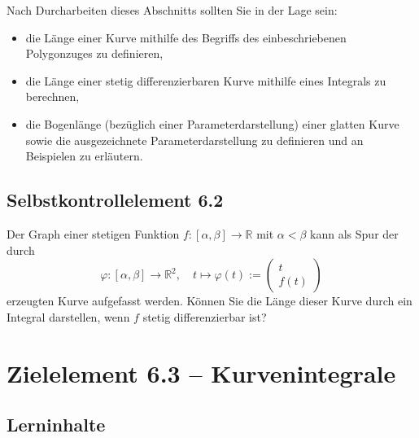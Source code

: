 \documentclass[a4paper,12pt]{article}
\begin{document}
Nach Durcharbeiten dieses Abschnitts sollten Sie in der Lage sein:
\begin{itemize}
  \item die Länge einer Kurve mithilfe des Begriffs des einbeschriebenen
        Polygonzuges zu definieren,
  \item die Länge einer stetig differenzierbaren Kurve mithilfe eines
        Integrals zu berechnen,
  \item die Bogenlänge (bezüglich einer Parameterdarstellung) einer glatten
        Kurve sowie die ausgezeichnete Parameterdarstellung zu definieren und
        an Beispielen zu erläutern.
\end{itemize}

\subsection*{Selbstkontrollelement 6.2}

Der Graph einer stetigen Funktion $f: [\alpha, \beta] \to \mathbb{R}$ mit
$\alpha < \beta$ kann als Spur der durch
\[
  \varphi: [\alpha, \beta] \to \mathbb{R}^2,\quad t \mapsto \varphi(t) := \begin{pmatrix}t \\ f(t)\end{pmatrix}
\]
erzeugten Kurve aufgefasst werden. Können Sie die Länge dieser Kurve durch
ein Integral darstellen, wenn $f$ stetig differenzierbar ist?

\newpage

\section*{Zielelement 6.3 -- Kurvenintegrale}

\subsection*{Lerninhalte}

\begin{center}
\end{center}
\end{document}
